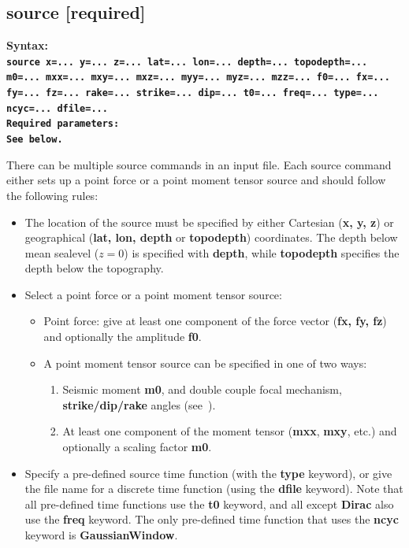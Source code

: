 \documentclass[11pt]{report}
\begin{document}
\subsection{source [required]}
\label{keyword:source}
\begin{flushleft}
\bf
Syntax:\\ \tt source
x=... y=... z=... lat=... lon=... depth=... topodepth=... m0=... mxx=... mxy=... mxz=...
myy=... myz=... mzz=... f0=... fx=... fy=... fz=... rake=... strike=... dip=... t0=... 
freq=... type=... ncyc=... dfile=...\\ 
\bf
Required parameters:\\ \rm See below.
\end{flushleft}
There can be multiple source commands in an input file. Each source command either sets up a point
force or a point moment tensor source and should follow the following rules:
\begin{itemize}
\item The location of the source must be specified by either Cartesian ({\bf x, y, z}) or
  geographical ({\bf lat, lon, depth} or {\bf topodepth}) coordinates. The depth below mean sealevel
  ($z=0$) is specified with {\bf depth}, while {\bf topodepth} specifies the depth below the
  topography.
\item Select a point force or a point moment tensor source:
  \begin{itemize}	
  \item Point force: give at least one component of the force vector ({\bf fx, fy, fz}) and
    optionally the amplitude {\bf f0}.
  \item A point moment tensor source can be specified in one of two ways:
    \begin{enumerate}
    \item Seismic moment {\bf m0}, and double couple focal mechanism, {\bf strike/dip/rake} angles
      (see~\cite{Aki-Richards-02}). 
    \item At least one component of the moment tensor ({\bf mxx}, {\bf mxy}, etc.) and optionally a
      scaling factor {\bf m0}. 
    \end{enumerate}
  \end{itemize}
\item Specify a pre-defined source time function (with the {\bf type} keyword), or give the file
  name for a discrete time function (using the {\bf dfile} keyword). Note that all pre-defined time
  functions use the {\bf t0} keyword, and all except {\bf Dirac} also use the {\bf freq}
  keyword. The only pre-defined time function that uses the {\bf ncyc} keyword is {\bf
    GaussianWindow}.
\end{itemize}
\end{document}
